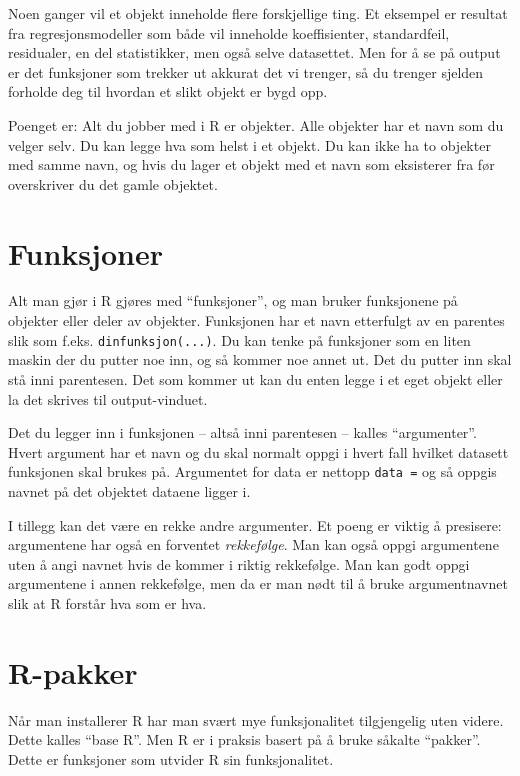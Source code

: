 \documentclass[
  norsk,
  letterpaper,
  DIV=11,
  numbers=noendperiod]{scrreprt}
\theoremstyle{definition}
\theoremstyle{remark}
\begin{document}
Noen ganger vil et objekt inneholde flere forskjellige ting. Et eksempel
er resultat fra regresjonsmodeller som både vil inneholde koeffisienter,
standardfeil, residualer, en del statistikker, men også selve
datasettet. Men for å se på output er det funksjoner som trekker ut
akkurat det vi trenger, så du trenger sjelden forholde deg til hvordan
et slikt objekt er bygd opp.

Poenget er: Alt du jobber med i R er objekter. Alle objekter har et navn
som du velger selv. Du kan legge hva som helst i et objekt. Du kan ikke
ha to objekter med samme navn, og hvis du lager et objekt med et navn
som eksisterer fra før overskriver du det gamle objektet.

\section{Funksjoner}\label{funksjoner}

Alt man gjør i R gjøres med ``funksjoner'', og man bruker funksjonene på
objekter eller deler av objekter. Funksjonen har et navn etterfulgt av
en parentes slik som f.eks. \texttt{dinfunksjon(...)}. Du kan tenke på
funksjoner som en liten maskin der du putter noe inn, og så kommer noe
annet ut. Det du putter inn skal stå inni parentesen. Det som kommer ut
kan du enten legge i et eget objekt eller la det skrives til
output-vinduet.

Det du legger inn i funksjonen -- altså inni parentesen -- kalles
``argumenter''. Hvert argument har et navn og du skal normalt oppgi i
hvert fall hvilket datasett funksjonen skal brukes på. Argumentet for
data er nettopp \texttt{data\ =} og så oppgis navnet på det objektet
dataene ligger i.

I tillegg kan det være en rekke andre argumenter. Et poeng er viktig å
presisere: argumentene har også en forventet \emph{rekkefølge}. Man kan
også oppgi argumentene uten å angi navnet hvis de kommer i riktig
rekkefølge. Man kan godt oppgi argumentene i annen rekkefølge, men da er
man nødt til å bruke argumentnavnet slik at R forstår hva som er hva.

\section{R-pakker}\label{r-pakker}

Når man installerer R har man svært mye funksjonalitet tilgjengelig uten
videre. Dette kalles ``base R''. Men R er i praksis basert på å bruke
såkalte ``pakker''. Dette er funksjoner som utvider R sin
funksjonalitet.
\end{document}
